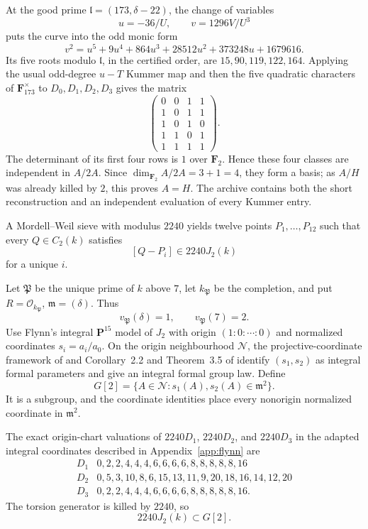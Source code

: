 \documentclass[11pt]{article}
\newcommand{\F}{\mathbf F}
\newcommand{\OO}{\mathcal O}
\newcommand{\m}{\mathfrak m}
\newcommand{\PP}{\mathfrak P}
\theoremstyle{definition}
\theoremstyle{remark}
\begin{document}
At the good prime $\mathfrak l=(173,\delta-22)$, the change of variables
\[
 u=-36/U,\qquad v=1296V/U^3
\]
puts the curve into the odd monic form
\[
 v^2=u^5+9u^4+864u^3+28512u^2+373248u+1679616.
\]
Its five roots modulo $\mathfrak l$, in the certified order, are
$15,90,119,122,164$.  Applying the usual odd-degree $u-T$ Kummer map and
then the five quadratic characters of $\F_{173}^{\times}$ to
$D_0,D_1,D_2,D_3$ gives the matrix
\[
 \begin{pmatrix}
 0&0&1&1\\
 1&0&1&1\\
 1&0&1&0\\
 1&1&0&1\\
 1&1&1&1
 \end{pmatrix}.
\]
The determinant of its first four rows is $1$ over $\F_2$.  Hence these
four classes are independent in $A/2A$.  Since
$\dim_{\F_2}A/2A=3+1=4$, they form a basis; as $A/H$ was already killed by
$2$, this proves $A=H$.  The archive contains both the short reconstruction
and an independent evaluation of every Kummer entry.

A Mordell--Weil sieve \cite{BruinStollSieve} with modulus $2240$ yields
twelve points
$P_1,\ldots,P_{12}$ such that every $Q\in C_2(k)$ satisfies
\begin{equation}\label{eq:section7-sieve}
            [Q-P_i]\in2240J_2(k)
\end{equation}
for a unique $i$.

Let $\PP$ be the unique prime of $k$ above $7$, let
$k_\PP$ be the completion, and put $R=\OO_{k_\PP}$, $\m=(\delta)$.  Thus
\[
                         v_\PP(\delta)=1,\qquad v_\PP(7)=2.
\]
Use Flynn's integral $\mathbf P^{15}$ model of $J_2$ with origin
$(1:0:\cdots:0)$ and normalized coordinates $s_i=a_i/a_0$.  On the
origin neighbourhood $\mathcal N$, the projective-coordinate framework of
\cite{CasselsFlynn} and Corollary~2.2 and Theorem~3.5 of \cite{Flynn}
identify $(s_1,s_2)$ as integral formal parameters and give an
integral formal group law.  Define
\begin{equation}\label{eq:G2}
 G[2]=\{A\in\mathcal N:s_1(A),s_2(A)\in\m^2\}.
\end{equation}
It is a subgroup, and the coordinate identities place every nonorigin
normalized coordinate in $\m^2$.

The exact origin-chart valuations of $2240D_1$, $2240D_2$, and $2240D_3$
in the adapted integral coordinates described in Appendix~\ref{app:flynn}
are
\begin{equation}\label{eq:section7-valuations}
\begin{array}{c|l}
D_1&0,2,2,4,4,4,6,6,6,6,8,8,8,8,8,16\\
D_2&0,5,3,10,8,6,15,13,11,9,20,18,16,14,12,20\\
D_3&0,2,2,4,4,4,6,6,6,6,8,8,8,8,8,16.
\end{array}
\end{equation}
The torsion generator is killed by $2240$, so
\begin{equation}\label{eq:2240G2}
                            2240J_2(k)\subset G[2].
\end{equation}
\end{document}

